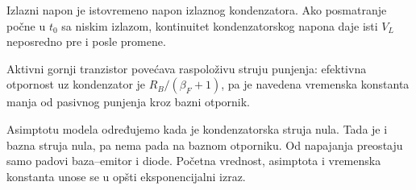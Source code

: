 Izlazni napon je istovremeno napon izlaznog kondenzatora. Ako posmatranje počne u $t_0$ sa niskim izlazom, kontinuitet kondenzatorskog napona daje isti $V_L$ neposredno pre i posle promene.

Aktivni gornji tranzistor povećava raspoloživu struju punjenja: efektivna otpornost uz kondenzator je $R_B/(\beta_F+1)$, pa je navedena vremenska konstanta manja od pasivnog punjenja kroz bazni otpornik.

Asimptotu modela određujemo kada je kondenzatorska struja nula. Tada je i bazna struja nula, pa nema pada na baznom otporniku. Od napajanja preostaju samo padovi baza–emitor i diode. Početna vrednost, asimptota i vremenska konstanta unose se u opšti eksponencijalni izraz.
